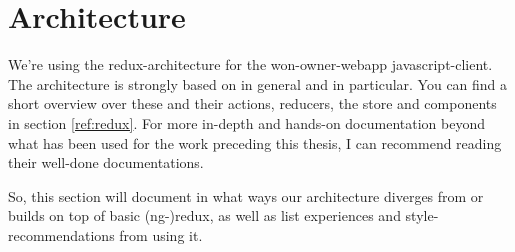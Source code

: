 \section{Architecture}\label{architecture}

We're using the redux-architecture for the won-owner-webapp javascript-client.
The architecture is strongly based on
 in general and
 in particular. You can
find a short overview over these and their actions, reducers, the store and components
in section \ref{ref:redux}. For more in-depth
and hands-on documentation beyond what has been used for the work preceding
this thesis, I can recommend reading their well-done documentations.

So, this section will document in what ways our architecture diverges from or
builds on top of basic (ng-)redux, as well as list experiences and
style-recommendations from using it. %


